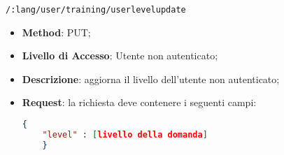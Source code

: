 \item \texttt{/:lang/user/training/userlevelupdate}
\begin{itemize}
	\item \textbf{Method}: PUT;
	\item \textbf{Livello di Accesso}: Utente non autenticato;
	\item \textbf{Descrizione}: aggiorna il livello dell'utente non autenticato;
	\item \textbf{Request}: la richiesta deve contenere i seguenti campi:
	\begin{lstlisting}[language=json,firstnumber=1]
	{
	"level" : [livello della domanda]
	}
	\end{lstlisting}
\end{itemize}